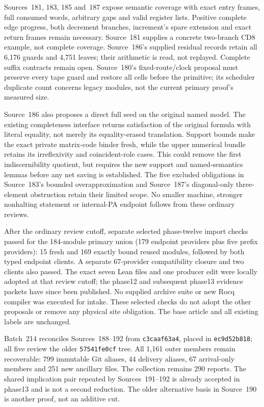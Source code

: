 \documentclass[11pt]{article}
\begin{document}
{Sources~181, 183, 185 and~187 expose semantic coverage with exact entry frames,
full consumed words, arbitrary gaps and valid register lists. Positive complete
edge progress, both decrement branches, increment's spare extension and exact
return frames remain necessary. Source~181 supplies a concrete two-branch CD8
example, not complete coverage. Source~186's supplied residual records retain
all 6,176 guards and 4,751 leaves; their arithmetic is read, not replayed.
Complete suffix contracts remain open. Source~180's fixed-route/clock proposal
must preserve every tape guard and restore all cells before the primitive;
its scheduler duplicate count concerns legacy modules, not the current
primary proof's measured size.

Source~186 also proposes a direct full seed on the original named model.
The existing completeness interface returns satisfaction of the original
formula with literal equality, not merely its equality-erased translation.
Support bounds make the exact private matrix-code binder fresh, while the
upper numerical bundle retains its irreflexivity and coincident-role cases.
This could remove the first indiscernibility quotient, but requires the new
support and named-semantics lemmas before any net saving is established.
The five excluded obligations in Source~183's bounded overapproximation and
Source~187's diagonal-only three-element obstruction retain their limited
scope. No smaller machine, stronger nonhalting statement or internal-PA
endpoint follows from these ordinary reviews.

After the ordinary review cutoff, separate selected phase-twelve import checks
passed for the 184-module primary union (179 endpoint providers plus five
prefix providers): 15 fresh and 169 exactly bound reused modules, followed by
both typed endpoint clients. A separate 67-provider compatibility closure and
two clients also passed. The exact seven Lean files and one producer edit were locally adopted at that
review cutoff; the phase12 and subsequent phase13 evidence packets have since
been published. No supplied archive suite or new Rocq compiler was executed for intake.
These selected checks do not adopt the other proposals or remove any physical
site obligation. The base article and all existing labels are unchanged.


Batch~214 reconciles Sources~188--192 from \texttt{c3caaf63a4}, placed in
\texttt{ec9d52b818}; all five review the older \texttt{57541fe0cf} tree.
All 1,161 outer members remain recoverable: 799 immutable Git aliases,
44 delivery aliases, 67 arrival-only members and 251 new ancillary files.
The collection remains 290 reports. The shared implication pair repeated by
Sources~191--192 is already accepted in phase13 and is not a second reduction.
The older alternative basis in Source~190 is another proof, not an additive cut.

}
\end{document}
